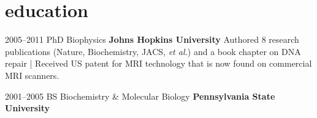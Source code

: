 \documentclass[]{friggeri-cv} %
\begin{document}

\section{education}

\begin{entrylist}


\entry
{2005--2011}
{PhD {\normalfont Biophysics}}
{\textbf{Johns Hopkins University}}
{Authored 8 research publications (Nature, Biochemistry, JACS, \textit{et al.}) and a book chapter on DNA repair | Received US patent for MRI technology that is now found on commercial MRI scanners.}


\entry
{2001--2005}
{BS {\normalfont Biochemistry \& Molecular Biology}}
{\textbf{Pennsylvania State University}}
{}


\end{entrylist}
\end{document}
